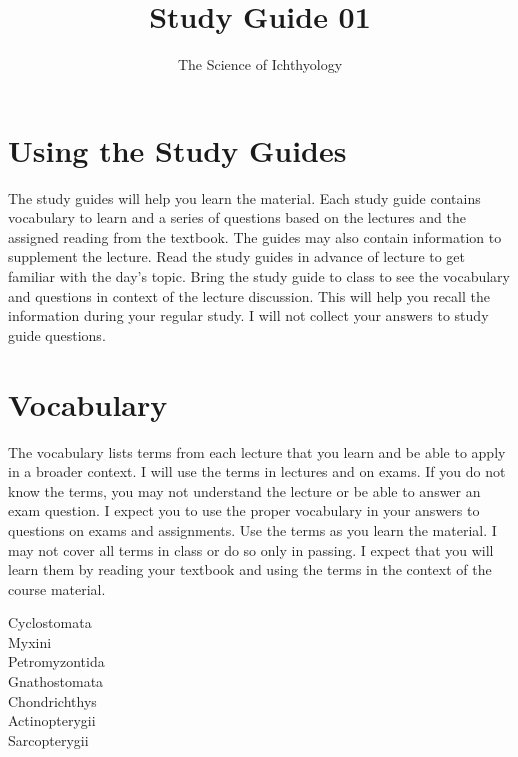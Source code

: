 \documentclass[nofonts, letterpaper]{tufte-handout}
\title{Study Guide 01}
\author{The Science of Ichthyology}
\date{} %
\begin{document}
\maketitle	%


\section{Using the Study Guides}
The study guides will help you learn the material.  Each study guide contains vocabulary to learn and a series of questions based on the lectures and the assigned reading from the textbook.  The guides may also contain information to supplement the lecture.  Read the study guides in advance of lecture to get familiar with the day's topic. Bring the study guide to class to see the vocabulary and questions in context of the lecture discussion.  This will help you recall the information during your regular study. I will not collect your answers to study guide questions.

\section{Vocabulary}
The vocabulary lists terms from each lecture that you learn and be able to apply in a broader context.  I will use the terms in lectures and on exams. If you do not know the terms, you may not understand the lecture or be able to answer an exam question. I expect you to use the proper vocabulary in your answers to questions on exams and assignments.  Use the terms as you learn the material.  I may not cover all terms in class or do so only in passing.  I expect that you will learn them by reading your textbook and using the terms in the context of the course material.

\begin{multicols}{2}
Cyclostomata\\
Myxini \\
Petromyzontida \\
Gnathostomata \\
Chondrichthys\\
Actinopterygii\\
Sarcopterygii\\
\end{multicols}
\end{document}
